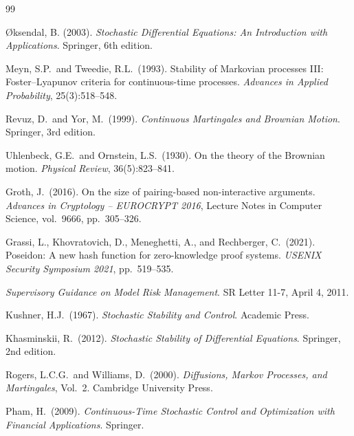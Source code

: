 \documentclass[12pt]{article}
\theoremstyle{plain}
\theoremstyle{definition}
\begin{document}

\begin{thebibliography}{99}

{\O}ksendal, B. (2003).
\textit{Stochastic Differential Equations: An Introduction with Applications}.
Springer, 6th edition.

Meyn, S.P.\ and Tweedie, R.L.\ (1993).
Stability of Markovian processes III: Foster--Lyapunov criteria for
continuous-time processes.
\textit{Advances in Applied Probability}, 25(3):518--548.

Revuz, D.\ and Yor, M.\ (1999).
\textit{Continuous Martingales and Brownian Motion}.
Springer, 3rd edition.

Uhlenbeck, G.E.\ and Ornstein, L.S.\ (1930).
On the theory of the Brownian motion.
\textit{Physical Review}, 36(5):823--841.

Groth, J.\ (2016).
On the size of pairing-based non-interactive arguments.
\textit{Advances in Cryptology -- EUROCRYPT 2016},
Lecture Notes in Computer Science, vol.\ 9666, pp.\ 305--326.

Grassi, L., Khovratovich, D., Meneghetti, A., and Rechberger, C.\ (2021).
Poseidon: A new hash function for zero-knowledge proof systems.
\textit{USENIX Security Symposium 2021}, pp.\ 519--535.

\newblock \textit{Supervisory Guidance on Model Risk Management}.
\newblock SR Letter 11-7, April 4, 2011.

Kushner, H.J.\ (1967).
\textit{Stochastic Stability and Control}.
Academic Press.

Khasminskii, R.\ (2012).
\textit{Stochastic Stability of Differential Equations}.
Springer, 2nd edition.

Rogers, L.C.G.\ and Williams, D.\ (2000).
\textit{Diffusions, Markov Processes, and Martingales}, Vol.\ 2.
Cambridge University Press.

Pham, H.\ (2009).
\textit{Continuous-Time Stochastic Control and Optimization with
Financial Applications}.
Springer.

\end{thebibliography}
\end{document}
